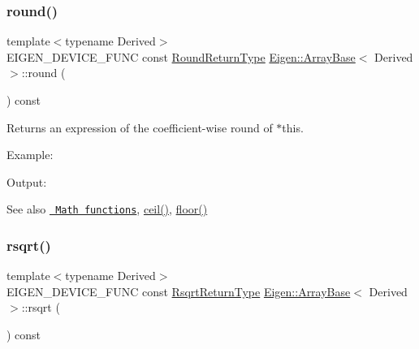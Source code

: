 \subsubsection{\texorpdfstring{round()}{round()}}
{\footnotesize\ttfamily template$<$typename Derived$>$ \\
E\+I\+G\+E\+N\+\_\+\+D\+E\+V\+I\+C\+E\+\_\+\+F\+U\+NC const \mbox{\hyperlink{class_eigen_1_1_cwise_unary_op}{Round\+Return\+Type}} \mbox{\hyperlink{class_eigen_1_1_array_base}{Eigen\+::\+Array\+Base}}$<$ Derived $>$\+::round (\begin{DoxyParamCaption}{ }\end{DoxyParamCaption}) const\hspace{0.3cm}{\ttfamily [inline]}}

\begin{DoxyReturn}{Returns}
an expression of the coefficient-\/wise round of $\ast$this.
\end{DoxyReturn}
Example\+: 
\begin{DoxyCodeInclude}{0}
\end{DoxyCodeInclude}
 Output\+: 
\begin{DoxyVerbInclude}
\end{DoxyVerbInclude}


\begin{DoxySeeAlso}{See also}
\href{group__CoeffwiseMathFunctions.html\#cwisetable_round}{\texttt{ Math functions}}, \mbox{\hyperlink{class_eigen_1_1_array_base_a644fa9e672def0cd2bdab1f4efe6400e}{ceil()}}, \mbox{\hyperlink{class_eigen_1_1_array_base_a1dbd24e0b04ddd157436086266f917fd}{floor()}} 
\end{DoxySeeAlso}
\mbox{\label{class_eigen_1_1_array_base_aa978767ac25c6d708d7ac41524f75252}} 
\subsubsection{\texorpdfstring{rsqrt()}{rsqrt()}}
{\footnotesize\ttfamily template$<$typename Derived$>$ \\
E\+I\+G\+E\+N\+\_\+\+D\+E\+V\+I\+C\+E\+\_\+\+F\+U\+NC const \mbox{\hyperlink{class_eigen_1_1_cwise_unary_op}{Rsqrt\+Return\+Type}} \mbox{\hyperlink{class_eigen_1_1_array_base}{Eigen\+::\+Array\+Base}}$<$ Derived $>$\+::rsqrt (\begin{DoxyParamCaption}{ }\end{DoxyParamCaption}) const\hspace{0.3cm}{\ttfamily [inline]}}

